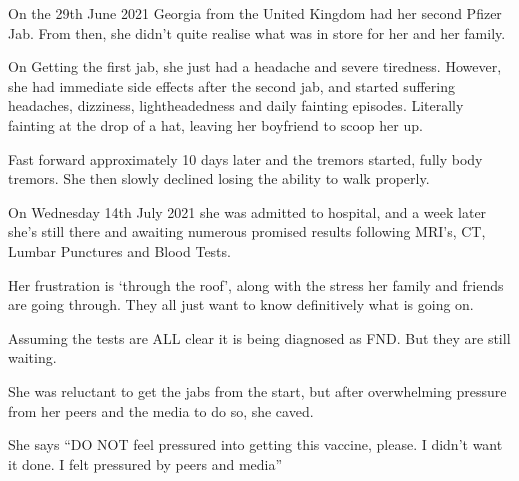 On the 29th June 2021 Georgia from the United Kingdom had her second Pfizer
Jab. From then, she didn’t quite realise what was in store for her and her
family.

On Getting the first jab, she just had a headache and severe tiredness. However,
she had immediate side effects after the second jab, and started suffering
headaches, dizziness, lightheadedness and daily fainting episodes. Literally
fainting at the drop of a hat, leaving her boyfriend to scoop her up.

Fast forward approximately 10 days later and the tremors started, fully body
tremors. She then slowly declined losing the ability to walk properly.

On Wednesday 14th July 2021 she was admitted to hospital, and a week later she’s
still there and awaiting numerous promised results following MRI’s, CT, Lumbar
Punctures and Blood Tests.

Her frustration is ‘through the roof’, along with the stress her family and
friends are going through. They all just want to know definitively what is going
on.

Assuming the tests are ALL clear it is being diagnosed as FND. But they are
still waiting.

She was reluctant to get the jabs from the start, but after overwhelming
pressure from her peers and the media to do so, she caved.

She says “DO NOT feel pressured into getting this vaccine, please. I didn’t want
it done. I felt pressured by peers and media”

